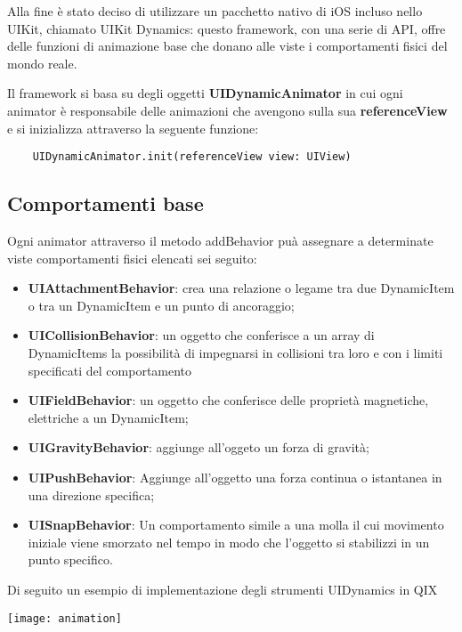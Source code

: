 Alla fine è stato deciso di utilizzare un pacchetto
nativo di iOS incluso nello UIKit\cite{uikit}, chiamato UIKit Dynamics\cite{uidynamics}: questo framework,
con una serie di API, offre delle funzioni di animazione base che 
donano alle viste i comportamenti fisici del mondo reale.

Il framework si basa su degli oggetti \textbf{UIDynamicAnimator} in cui ogni animator è responsabile delle
animazioni che avengono sulla sua \textbf{referenceView} e si inizializza 
attraverso la seguente funzione:

\begin{verbatim}
    UIDynamicAnimator.init(referenceView view: UIView)
\end{verbatim}


\subsection{Comportamenti base}

Ogni animator attraverso il metodo addBehavior puà assegnare a determinate
viste comportamenti fisici elencati sei seguito: 

\begin{itemize}
    \item\textbf{UIAttachmentBehavior}: crea una relazione o legame tra due DynamicItem o tra un DynamicItem e un punto di ancoraggio;
    \item\textbf{UICollisionBehavior}: un oggetto che conferisce a un array di DynamicItems la possibilità di impegnarsi in collisioni tra loro e con i limiti specificati del comportamento
    \item\textbf{UIFieldBehavior}: un oggetto che conferisce delle proprietà magnetiche, elettriche a un DynamicItem;
    \item\textbf{UIGravityBehavior}: aggiunge all'oggeto un forza di gravità;
    \item\textbf{UIPushBehavior}: Aggiunge all'oggetto una forza continua o istantanea in una direzione specifica;
    \item\textbf{UISnapBehavior}: Un comportamento simile a una molla il cui movimento iniziale viene smorzato nel tempo in modo che l'oggetto si stabilizzi in un punto specifico.
\end{itemize}

Di seguito un esempio di implementazione degli strumenti UIDynamics in QIX

\begin{minipage}{\linewidth}
    \centering
    \texttt{[image: animation]}
    \label{fig:6}
\end{minipage}\\